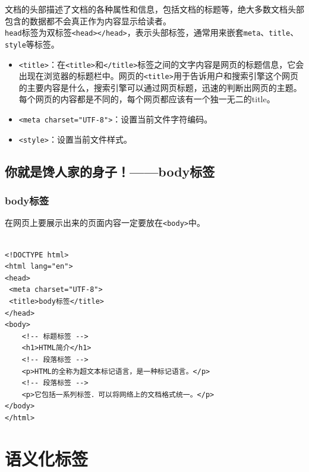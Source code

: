 文档的头部描述了文档的各种属性和信息，包括文档的标题等，绝大多数文档头部包含的数据都不会真正作为内容显示给读者。 \\

\lstinline|head|标签为双标签\lstinline|<head></head>|，表示头部标签，通常用来嵌套\lstinline|meta|、\lstinline|title|、\lstinline|style|等标签。

\begin{itemize}
    \item \lstinline|<title>|：在\lstinline|<title>|和\lstinline|</title>|标签之间的文字内容是网页的标题信息，它会出现在浏览器的标题栏中。网页的\lstinline|<title>|用于告诉用户和搜索引擎这个网页的主要内容是什么，搜索引擎可以通过网页标题，迅速的判断出网页的主题。每个网页的内容都是不同的，每个网页都应该有一个独一无二的title。

    \item \lstinline|<meta charset="UTF-8">|：设置当前文件字符编码。

    \item \lstinline|<style>|：设置当前文件样式。
\end{itemize}

\newpage

\section{你就是馋人家的身子！——body标签}

\subsection{body标签}

在网页上要展示出来的页面内容一定要放在\lstinline|<body>|中。 \\

 \\
\begin{lstlisting}[style=htmlcssjs]
<!DOCTYPE html>
<html lang="en">
<head>
 <meta charset="UTF-8">
 <title>body标签</title>
</head>
<body>
    <!-- 标题标签 -->
    <h1>HTML简介</h1>
    <!-- 段落标签 -->
    <p>HTML的全称为超文本标记语言，是一种标记语言。</p>
    <!-- 段落标签 -->
    <p>它包括一系列标签．可以将网络上的文档格式统一。</p>
</body>
</html>
\end{lstlisting}

\newpage

\chapter{语义化标签}

